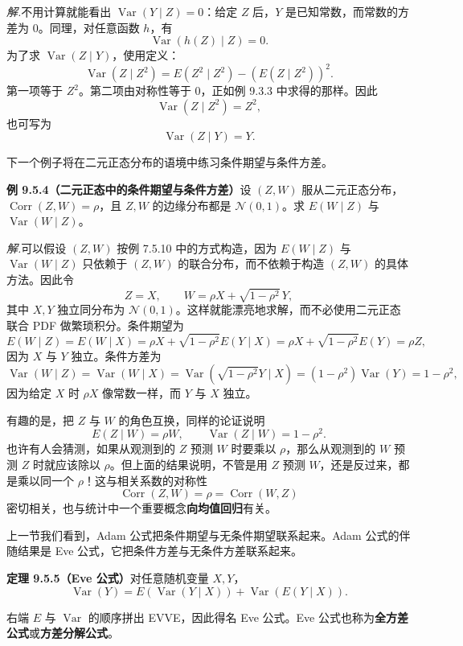 \documentclass[UTF8, 12pt, fontset=fandol, oneside]{ctexart}
\begin{document}
\noindent\textit{解.}\quad 不用计算就能看出 $\operatorname{Var}(Y\mid Z)=0$：给定 $Z$ 后，$Y$ 是已知常数，而常数的方差为 $0$。同理，对任意函数 $h$，有
\[
  \operatorname{Var}(h(Z)\mid Z)=0.
\]
为了求 $\operatorname{Var}(Z\mid Y)$，使用定义：
\[
  \operatorname{Var}(Z\mid Z^2)=E(Z^2\mid Z^2)-(E(Z\mid Z^2))^2.
\]
第一项等于 $Z^2$。第二项由对称性等于 $0$，正如例 9.3.3 中求得的那样。因此
\[
  \operatorname{Var}(Z\mid Z^2)=Z^2,
\]
也可写为
\[
  \operatorname{Var}(Z\mid Y)=Y.
\]

下一个例子将在二元正态分布的语境中练习条件期望与条件方差。

\noindent\textbf{例 9.5.4（二元正态中的条件期望与条件方差）}\quad 设 $(Z,W)$ 服从二元正态分布，$\operatorname{Corr}(Z,W)=\rho$，且 $Z,W$ 的边缘分布都是 $\mathcal N(0,1)$。求 $E(W\mid Z)$ 与 $\operatorname{Var}(W\mid Z)$。

\noindent\textit{解.}\quad 可以假设 $(Z,W)$ 按例 7.5.10 中的方式构造，因为 $E(W\mid Z)$ 与 $\operatorname{Var}(W\mid Z)$ 只依赖于 $(Z,W)$ 的联合分布，而不依赖于构造 $(Z,W)$ 的具体方法。因此令
\[
  Z=X,\qquad W=\rho X+\sqrt{1-\rho^2}\,Y,
\]
其中 $X,Y$ 独立同分布为 $\mathcal N(0,1)$。这样就能漂亮地求解，而不必使用二元正态联合 PDF 做繁琐积分。条件期望为
\[
  E(W\mid Z)=E(W\mid X)
  =\rho X+\sqrt{1-\rho^2}E(Y\mid X)
  =\rho X+\sqrt{1-\rho^2}E(Y)=\rho Z,
\]
因为 $X$ 与 $Y$ 独立。条件方差为
\[
  \operatorname{Var}(W\mid Z)=\operatorname{Var}(W\mid X)
  =\operatorname{Var}(\sqrt{1-\rho^2}Y\mid X)
  =(1-\rho^2)\operatorname{Var}(Y)=1-\rho^2,
\]
因为给定 $X$ 时 $\rho X$ 像常数一样，而 $Y$ 与 $X$ 独立。

有趣的是，把 $Z$ 与 $W$ 的角色互换，同样的论证说明
\[
  E(Z\mid W)=\rho W,\qquad \operatorname{Var}(Z\mid W)=1-\rho^2.
\]
也许有人会猜测，如果从观测到的 $Z$ 预测 $W$ 时要乘以 $\rho$，那么从观测到的 $W$ 预测 $Z$ 时就应该除以 $\rho$。但上面的结果说明，不管是用 $Z$ 预测 $W$，还是反过来，都是乘以同一个 $\rho$！这与相关系数的对称性
\[
  \operatorname{Corr}(Z,W)=\rho=\operatorname{Corr}(W,Z)
\]
密切相关，也与统计中一个重要概念\textbf{向均值回归}有关。

上一节我们看到，Adam 公式把条件期望与无条件期望联系起来。Adam 公式的伴随结果是 Eve 公式，它把条件方差与无条件方差联系起来。

\noindent\textbf{定理 9.5.5（Eve 公式）}\quad 对任意随机变量 $X,Y$，
\[
  \operatorname{Var}(Y)=E(\operatorname{Var}(Y\mid X))+\operatorname{Var}(E(Y\mid X)).
\]

右端 $E$ 与 $\operatorname{Var}$ 的顺序拼出 EVVE，因此得名 Eve 公式。Eve 公式也称为\textbf{全方差公式}或\textbf{方差分解公式}。
\end{document}

